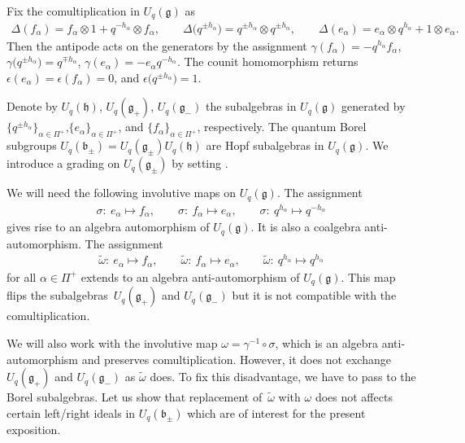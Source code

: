 \documentclass[11pt]{article}
\numberwithin{equation}{section}
\begin{document}
Fix the comultiplication in $U_q(\mathfrak{g})$ as
\begin{gather*}
\Delta(f_\alpha)= f_\alpha\otimes 1+q^{-h_\alpha}\otimes f_\alpha,\qquad\!\! \Delta\big(q^{\pm h_\alpha}\big)=q^{\pm h_\alpha}\otimes q^{\pm h_\alpha},\qquad\!\!\Delta(e_\alpha)= e_\alpha\otimes q^{h_\alpha}+1\otimes e_\alpha.
\end{gather*}
Then the antipode acts on the generators by the assignment $\gamma( f_\alpha)=- q^{h_\alpha}f_\alpha$, $\gamma\big( q^{\pm h_\alpha}\big)=q^{\mp h_\alpha}$, $\gamma( e_\alpha)=- e_\alpha q^{-h_\alpha}$. The counit homomorphism returns $\epsilon(e_\alpha)=\epsilon(f_\alpha)=0$, and $\epsilon\big(q^{\pm h_\alpha}\big)=1$.

Denote by $U_q(\mathfrak{h})$, $U_q(\mathfrak{g}_+)$, $U_q(\mathfrak{g}_-)$ the subalgebras in $U_q(\mathfrak{g})$ generated by $\big\{q^{\pm h_\alpha}\big\}_{\alpha\in \Pi^+}$,\linebreak $\{e_\alpha\}_{\alpha\in \Pi^+}$, and $\{f_\alpha\}_{\alpha\in \Pi^+}$, respectively. The quantum Borel subgroups $U_q(\mathfrak{b}_\pm)=U_q(\mathfrak{g}_\pm)U_q(\mathfrak{h})$ are Hopf subalgebras in $U_q\!(\mathfrak{g})$. We introduce a grading on $U_q\!(\mathfrak{g}_\pm\!)$ by setting .

We will need the following involutive maps on $U_q(\mathfrak{g})$.
The assignment
\begin{gather*}
\sigma\colon \ e_\alpha\mapsto f_\alpha, \qquad\sigma\colon \ f_\alpha\mapsto e_\alpha, \qquad \sigma\colon \ q^{h_\alpha}\mapsto q^{-h_\alpha}
\end{gather*}
gives rise to an algebra automorphism of $U_q(\mathfrak{g})$. It is also a coalgebra anti-automorphism. The assignment
\begin{gather*}
\tilde \omega\colon \ e_\alpha\mapsto f_\alpha, \qquad\tilde \omega\colon \ f_\alpha\mapsto e_\alpha, \qquad \tilde \omega\colon \ q^{h_\alpha}\mapsto q^{h_\alpha}
\end{gather*}
for all $\alpha \in \Pi^+$ extends to an algebra anti-automorphism of $U_q(\mathfrak{g})$. This map flips the subalgebras~$U_q(\mathfrak{g}_+)$ and $U_q(\mathfrak{g}_-)$ but it is not compatible with the comultiplication.

We will also work with the involutive map $\omega =\gamma^{-1}\circ \sigma$, which is an algebra anti-automorphism and preserves comultiplication. However, it does not exchange $U_q(\mathfrak{g}_+)$ and $U_q(\mathfrak{g}_-)$ as $\tilde \omega$ does. To fix this disadvantage, we have to pass to the Borel subalgebras. Let us show that replacement of~$\tilde \omega$ with $\omega$ does not affects certain left/right ideals in $U_q(\mathfrak{b}_\pm)$ which are of interest for the present exposition.
\end{document}
